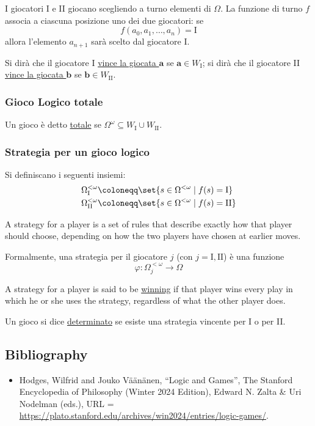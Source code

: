 \documentclass{article}
\newcommand{\1}{\mathds{1}}
\begin{document}
I giocatori I e II giocano scegliendo a turno elementi di \(\Omega\). La funzione di turno \(f\) associa a ciascuna posizione uno dei due giocatori: se
\begin{equation*}
f(a_{0},a_{1},\dots,a_{n}) = \text{I}
\end{equation*}
allora l'elemento \(a_{n+1}\) sarà scelto dal giocatore I.

Si dirà che il giocatore I \uline{vince la giocata \(\bm{a}\)} se \(\bm{a} \in W_{\text{I}}\); si dirà che il giocatore II \uline{vince la giocata \(\bm{b}\)} se \(\bm{b} \in W_{\text{II}}\).
\subsubsection{Gioco Logico totale}
\label{sec:org8c60113}
Un gioco è detto \uline{totale} se \(\Omega^{\omega} \subseteq W_{\text{I}}\cup W_{\text{II}}\).
\subsubsection{Strategia per un gioco logico}
\label{sec:org7f68e17}
Si definiscano i seguenti insiemi:
\begin{align*}
\Omega^{<\omega}_{\text{I}} &\coloneqq \set{s \in \Omega^{<\omega}\mid f(s) = \text{I}}\\
\Omega^{<\omega}_{\text{II}} &\coloneqq \set{s \in \Omega^{<\omega}\mid f(s) = \text{II}}
\end{align*}

A strategy for a player is a set of rules that describe exactly how that player should choose, depending on how the two players have chosen at earlier moves.

Formalmente, una strategia per il giocatore \(j\) (con \(j=\text{I},\text{II}\)) è una funzione
\begin{equation*}
\varphi: \Omega_{j}^{<\omega} \to \Omega
\end{equation*}

A strategy for a player is said to be \uline{winning} if that player wins every play in which he or she uses the strategy, regardless of what the other player does.

Un gioco si dice \uline{determinato} se esiste una strategia vincente per I o per II.
\subsection{Bibliography}
\label{sec:org749d900}
\begin{itemize}
\item Hodges, Wilfrid and Jouko Väänänen, ``Logic and Games'', The Stanford Encyclopedia of Philosophy (Winter 2024 Edition), Edward N. Zalta \& Uri Nodelman (eds.), URL = \url{https://plato.stanford.edu/archives/win2024/entries/logic-games/}.
\end{itemize}
\end{document}
